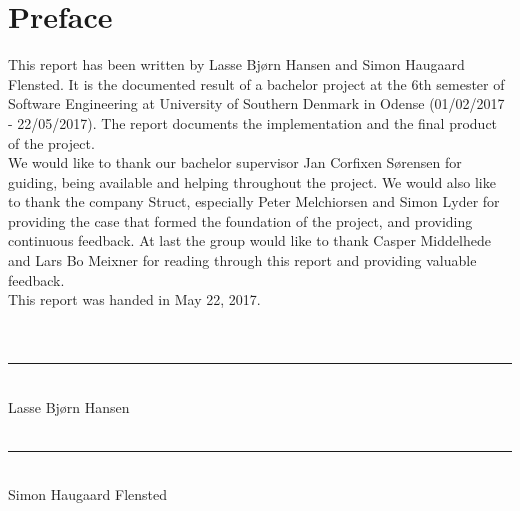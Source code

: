 \chapter{Preface}
This report has been written by Lasse Bjørn Hansen and Simon Haugaard Flensted. It is the documented result of a bachelor project at the 6th semester of Software Engineering at University of Southern
Denmark in Odense (01/02/2017 - 22/05/2017). The report documents the implementation and the final product of the project.\\

\noindent We would like to thank our bachelor supervisor Jan Corfixen Sørensen for guiding, being available and helping throughout the project. We would also like to thank the company \gls{Struct}, especially Peter Melchiorsen and Simon Lyder for providing the case that formed the foundation of the project, and providing continuous feedback. At last the group would like to thank Casper Middelhede and Lars Bo Meixner for reading through this report and providing valuable feedback.
\\

\noindent This report was handed in May 22, 2017.
\\
\\
\\

\noindent\rule[0.5em]{26em}{0.5pt}\\
\noindent Lasse Bjørn Hansen 
\\
\\

\noindent\rule[0.5em]{26em}{0.5pt}\\
\noindent Simon Haugaard Flensted 
\\
\\